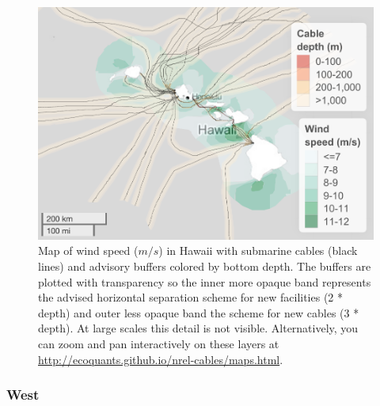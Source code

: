 \documentclass[]{article}
\begin{document}
\begin{figure}
\centering
\includegraphics{report_files/figure-latex/mapWindHawaii-1.pdf}
\caption{\label{fig:mapWindHawaii}Map of wind speed (\(m/s\)) in Hawaii with
submarine cables (black lines) and advisory buffers colored by bottom
depth. The buffers are plotted with transparency so the inner more
opaque band represents the advised horizontal separation scheme for new
facilities (2 * depth) and outer less opaque band the scheme for new
cables (3 * depth). At large scales this detail is not visible.
Alternatively, you can zoom and pan interactively on these layers at
\url{http://ecoquants.github.io/nrel-cables/maps.html}.}
\end{figure}

\hypertarget{west-2}{%
\subsubsection{West}\label{west-2}}
\end{document}

